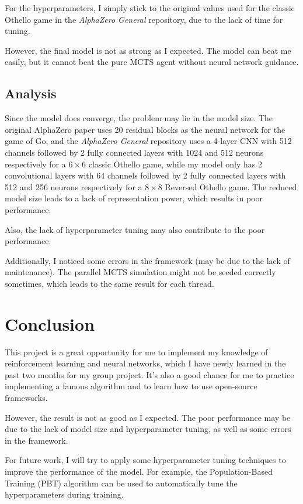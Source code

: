 \documentclass[conference]{IEEEtran}
\begin{document}
For the hyperparameters, I simply stick to the original values used for the classic Othello game in the \textit{AlphaZero General} repository, due to the lack of time for tuning.

However, the final model is not as strong as I expected.
The model can beat me easily, but it cannot beat the pure MCTS agent without neural network guidance.

\subsection{Analysis}
Since the model does converge, the problem may lie in the model size.
The original AlphaZero paper uses 20 residual blocks as the neural network for the game of Go, and the \textit{AlphaZero General} repository uses a 4-layer CNN with 512 channels followed by 2 fully connected layers with 1024 and 512 neurons respectively for a $6 \times 6$ classic Othello game, while my model only has 2 convolutional layers with 64 channels followed by 2 fully connected layers with 512 and 256 neurons respectively for a $8 \times 8$ Reversed Othello game.
The reduced model size leads to a lack of representation power, which results in poor performance.

Also, the lack of hyperparameter tuning may also contribute to the poor performance.

Additionally, I noticed some errors in the framework (may be due to the lack of maintenance). The parallel MCTS simulation might not be seeded correctly sometimes, which leads to the same result for each thread.

\section{Conclusion}
This project is a great opportunity for me to implement my knowledge of reinforcement learning and neural networks, which I have newly learned in the past two months for my group project.
It's also a good chance for me to practice implementing a famous algorithm and to learn how to use open-source frameworks.

However, the result is not as good as I expected.
The poor performance may be due to the lack of model size and hyperparameter tuning, as well as some errors in the framework.

For future work, I will try to apply some hyperparameter tuning techniques to improve the performance of the model.
For example, the Population-Based Training (PBT) algorithm can be used to automatically tune the hyperparameters during training.



\end{document}
